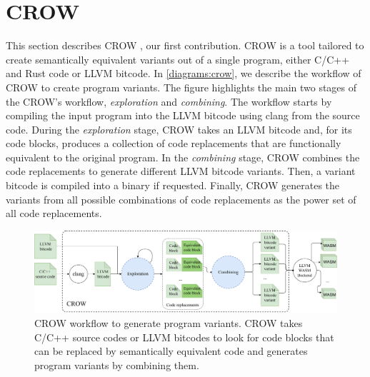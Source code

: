 
\section{CROW}
\label{section:crow}


This section describes CROW \cite{CROW}, our first contribution. CROW is a tool tailored to create semantically equivalent \wasm variants out of a single program, either C/C++ and Rust code or LLVM bitcode.
In \autoref{diagrams:crow}, we describe the workflow of CROW to create program variants.
The figure highlights the main two stages of the CROW's workflow, \textit{exploration} and \textit{combining}. The workflow starts by compiling the input program into the LLVM bitcode using clang from the source code. During the \emph{exploration} stage, CROW takes an LLVM bitcode and, for its code blocks, produces a collection of code replacements that are functionally equivalent to the original program. 
In the \emph{combining} stage, CROW combines the code replacements to generate different LLVM bitcode variants. 
Then, a variant bitcode is compiled into a \wasm binary if requested. Finally, CROW generates the variants from all possible combinations of code replacements as the power set of all code replacements.  


\begin{figure}[h]
    \includegraphics[width=\linewidth]{diagrams/generation/crow.drawio.pdf}
    \caption{CROW workflow to generate program variants. CROW takes C/C++ source codes or LLVM bitcodes to look for code blocks that can be replaced by semantically equivalent code and generates program variants by combining them.}
    \label{diagrams:crow}
\end{figure}



